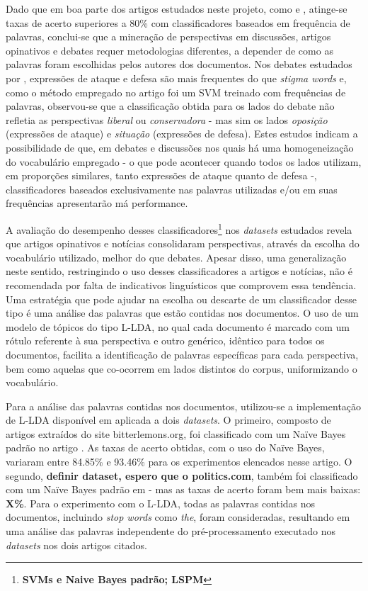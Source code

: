 Dado que em boa parte dos artigos estudados neste projeto, como \cite{lin-et-al2006} e \cite{klebanov}, atinge-se taxas de acerto superiores a 80\% com classificadores baseados em frequência de palavras, conclui-se que a mineração de perspectivas em discussões, artigos opinativos e debates requer metodologias diferentes, a depender de como as palavras foram escolhidas pelos autores dos documentos. Nos debates estudados por \cite{hirst-et-al}, expressões de ataque e defesa são mais frequentes do que \emph{stigma words} e, como o método empregado no artigo foi um SVM treinado com frequências de palavras, observou-se que a classificação obtida para os lados do debate não refletia as perspectivas \emph{liberal} ou \emph{conservadora} - mas sim os lados \emph{oposição} (expressões de ataque) e \emph{situação} (expressões de defesa). Estes estudos indicam a possibilidade de que, em debates e discussões nos quais há uma homogeneização do vocabulário empregado - o que pode acontecer quando todos os lados utilizam, em proporções similares, tanto expressões de ataque quanto de defesa -, classificadores baseados exclusivamente nas palavras utilizadas e/ou em suas frequências apresentarão má performance.

A avaliação do desempenho desses classificadores\footnote{\textbf{SVMs e Naive Bayes padrão; LSPM}} nos \emph{datasets} estudados revela que artigos opinativos e notícias consolidaram perspectivas, através da escolha do vocabulário utilizado, melhor do que debates. Apesar disso, uma generalização neste sentido, restringindo o uso desses classificadores a artigos e notícias, não é recomendada por falta de indicativos linguísticos que comprovem essa tendência. Uma estratégia que pode ajudar na escolha ou descarte de um classificador desse tipo é uma análise das palavras que estão contidas nos documentos. O uso de um modelo de tópicos do tipo L-LDA, no qual cada documento é marcado com um rótulo referente à sua perspectiva e outro genérico, idêntico para todos os documentos, facilita a identificação de palavras específicas para cada perspectiva, bem como aquelas que co-ocorrem em lados distintos do corpus, uniformizando o vocabulário.

Para a análise das palavras contidas nos documentos, utilizou-se a implementação de L-LDA disponível em \cite{top-llda} aplicada a dois \emph{datasets}. O primeiro, composto de artigos extraídos do site bitterlemons.org, foi classificado com um Naïve Bayes padrão no artigo \cite{lin-et-al2006}. As taxas de acerto obtidas, com o uso do Naïve Bayes, variaram entre 84.85\% e 93.46\% para os experimentos elencados nesse artigo. O segundo, \textbf{definir dataset, espero que o politics.com}, também foi classificado com um Naïve Bayes padrão em \cite{malouf-taking_sides} - mas as taxas de acerto foram bem mais baixas: \textbf{X\%}. Para o experimento com o L-LDA, todas as palavras contidas nos documentos, incluindo \emph{stop words} como \emph{the}, foram consideradas, resultando em uma análise das palavras independente do pré-processamento executado nos \emph{datasets} nos dois artigos citados.

